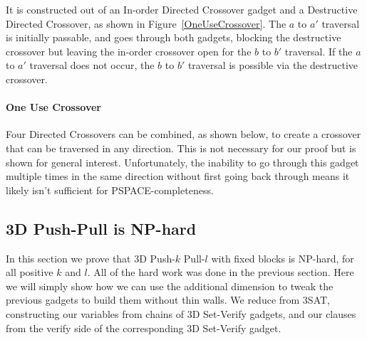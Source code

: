 It is constructed out of an In-order Directed Crossover gadget and a Destructive Directed Crossover, as shown in Figure~\ref{OneUseCrossover}. The $a$ to $a'$ traversal is initially passable, and goes through both gadgets,
blocking the destructive crossover but leaving the in-order crossover open for the $b$ to $b'$ traversal. If the $a$ to $a'$ traversal does not occur, the $b$ to $b'$ traversal is possible via the destructive crossover.

\paragraph{One Use Crossover} 
Four Directed Crossovers can be combined, as shown below, to create a crossover that can be traversed in any direction. This is not necessary for our proof but is shown for general interest. Unfortunately, the inability to go through this gadget multiple times in the same direction without first going back through means it likely isn't sufficient for PSPACE-completeness. 

\subsection{3D Push-Pull is NP-hard}
\label{3DNPhard}
In this section we prove that 3D Push-$k$ Pull-$l$ with fixed blocks is NP-hard, for all positive $k$ and $l$. All of the hard work was done in the previous section. Here we will simply show how we can use the additional dimension to tweak the previous gadgets to build them without thin walls. We reduce from 3SAT, constructing our variables from chains of 3D Set-Verify gadgets, and our clauses from the verify side of the corresponding 3D Set-Verify gadget.

